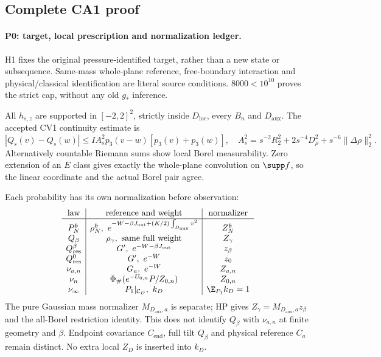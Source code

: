 \subsection{Complete CA1 proof}
\paragraph{P0: target, local prescription and normalization ledger.}
H1 fixes the original pressure-identified target, rather than a new state or
subsequence. Same-mass whole-plane reference, free-boundary interaction and
physical/classical identification are literal source conditions.
$8000<10^{10}$ proves the strict cap, without any old $g_*$ inference.

All $h_{s,z}$ are supported in $[-2,2]^2$, strictly inside $D_{\mathrm{loc}}$,
every $B_n$ and $D_{\mathrm{aux}}$. The accepted CV1 continuity estimate is
\[
 |Q_s(v)-Q_s(w)|\le IA_s^2p_3(v-w)[p_3(v)+p_3(w)],\quad
 A_s^2=s^{-2}R_2^2+2s^{-4}D_\rho^2+s^{-6}\|\Delta\rho\|_2^2 .
\]
Alternatively countable Riemann sums show local Borel measurability.
Zero extension of an $E$ class gives exactly the whole-plane convolution on
$\supp f$, so the linear coordinate and the actual Borel pair agree.

Each probability has its own normalization before observation:
\[
\begin{array}{c|c|c}
 \text{law}&\text{reference and weight}&\text{normalizer}\\ \hline
 P_N^{\mathfrak b}&\rho_N^{\mathfrak b},\ e^{-W-\beta J_{\mathrm{out}}
                                  +(K/2)\int_{D_{\mathrm{aux}}}v^2}
                                  &Z_N^{\mathfrak b}\\
 Q_\beta&\rho_\gamma,\ \text{same full weight}&Z_\gamma\\
 Q_{\mathrm{res}}^\beta&G',\ e^{-W-\beta J_{\mathrm{out}}}&z_\beta\\
 Q_{\mathrm{res}}^0&G',\ e^{-W}&z_0\\
 \nu_{a,n}&G_a,\ e^{-W}&Z_{a,n}\\
 \nu_n&\Phi_\#(e^{-U_{0,n}}P/Z_{0,n})&Z_{0,n}\\
 \nu_\infty&P_1|_{\mathcal C_D},\ k_D&\E_{P_1}k_D=1
\end{array}
\]
The pure Gaussian mass normalizer $M_{D_{\mathrm{aux}},a}$ is separate;
HP gives $Z_\gamma=M_{D_{\mathrm{aux}},a}z_\beta$ and the all-Borel
restriction identity. This does not identify $Q_\beta$ with $\nu_{a,n}$
at finite geometry and $\beta$. Endpoint covariance $C_{\mathrm{end}}$,
full tilt $Q_\beta$ and physical reference $C_a$ remain distinct.
No extra local $Z_D$ is inserted into $k_D$.


